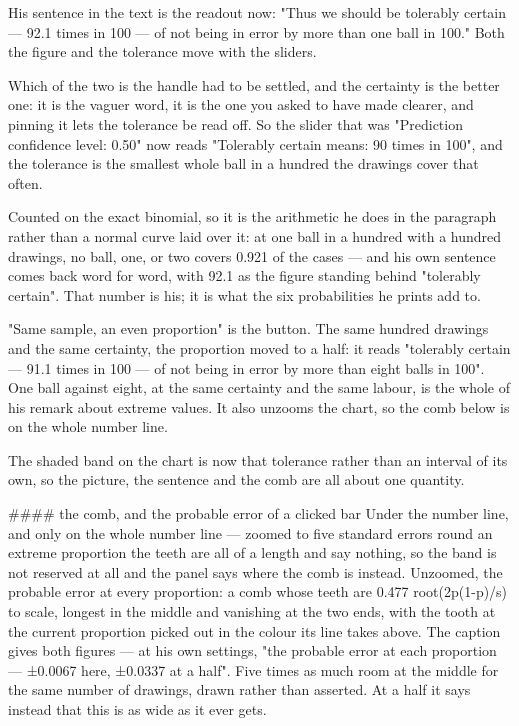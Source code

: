 His sentence in the text is the readout now: "Thus we should be tolerably
certain — 92.1 times in 100 — of not being in error by more than one ball in
100." Both the figure and the tolerance move with the sliders.

Which of the two is the handle had to be settled, and the certainty is the
better one: it is the vaguer word, it is the one you asked to have made clearer,
and pinning it lets the tolerance be read off. So the slider that was
"Prediction confidence level: 0.50" now reads "Tolerably certain means: 90 times
in 100", and the tolerance is the smallest whole ball in a hundred the drawings
cover that often.

Counted on the exact binomial, so it is the arithmetic he does in the paragraph
rather than a normal curve laid over it: at one ball in a hundred with a hundred
drawings, no ball, one, or two covers 0.921 of the cases — and his own sentence
comes back word for word, with 92.1 as the figure standing behind "tolerably
certain". That number is his; it is what the six probabilities he prints add to.

"Same sample, an even proportion" is the button. The same hundred drawings and
the same certainty, the proportion moved to a half: it reads "tolerably certain
— 91.1 times in 100 — of not being in error by more than eight balls in 100".
One ball against eight, at the same certainty and the same labour, is the whole
of his remark about extreme values. It also unzooms the chart, so the comb below
is on the whole number line.

The shaded band on the chart is now that tolerance rather than an interval of
its own, so the picture, the sentence and the comb are all about one quantity.

#### the comb, and the probable error of a clicked bar
Under the number line, and only on the whole number line — zoomed to five
standard errors round an extreme proportion the teeth are all of a length and
say nothing, so the band is not reserved at all and the panel says where the
comb is instead. Unzoomed, the probable error at every proportion: a comb whose teeth are 0.477 root(2p(1-p)/s) to scale, longest in
the middle and vanishing at the two ends, with the tooth at the current
proportion picked out in the colour its line takes above. The caption gives both
figures — at his own settings, "the probable error at each proportion — ±0.0067
here, ±0.0337 at a half". Five times as much room at the middle for the same
number of drawings, drawn rather than asserted. At a half it says instead that
this is as wide as it ever gets.

